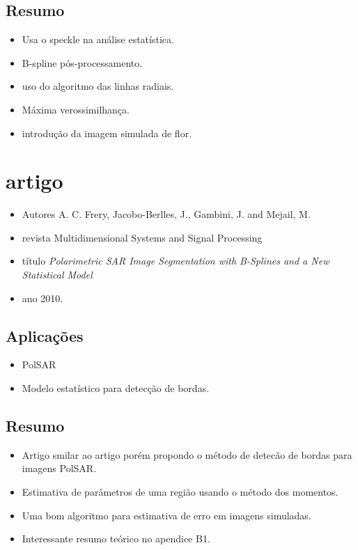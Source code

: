 \documentclass{article}
\begin{document}
\subsection{Resumo}
\begin{itemize}
\item Usa o speckle na análise estatística.
\item B-spline pós-processamento.
\item uso do algoritmo das linhas radiais.
\item Máxima verossimilhança.
\item introdução da imagem simulada de flor.
\end{itemize}

\section{artigo \cite{fbgm}}
\begin{itemize}
\item Autores A. C. Frery, Jacobo-Berlles, J., Gambini, J. and Mejail, M.
\item revista Multidimensional Systems and Signal Processing
\item título \textit{Polarimetric {SAR} Image Segmentation with {B-Splines} and a New Statistical Model}
\item ano 2010.
\end{itemize}
\subsection{Aplicações}
\begin{itemize}
\item PolSAR
\item Modelo estatístico para detecção de bordas.
\end{itemize}
\subsection{Resumo}
\begin{itemize}
\item Artigo smilar ao artigo \cite{gmbf} porém propondo o método de detecão de bordas para imagens PolSAR.
\item Estimativa de parâmetros de uma região usando o método dos momentos. 
\item Uma bom algoritmo para estimativa de erro em imagens simuladas.
\item Interessante resumo teórico no apendice B1.
\end{itemize}
\end{document}
